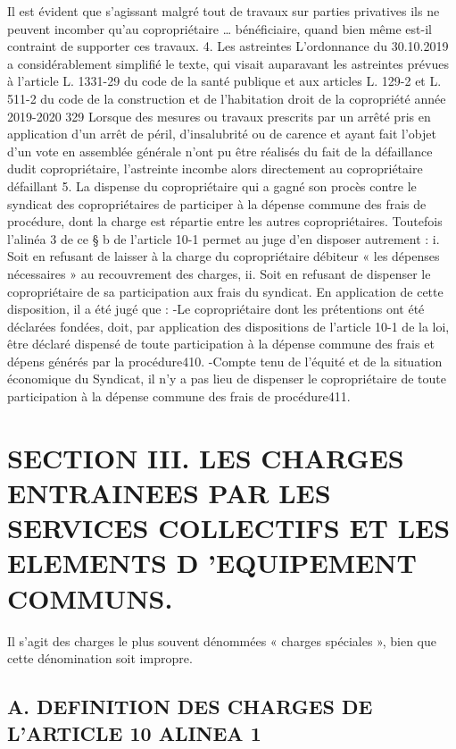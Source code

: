 		Il est évident que s’agissant malgré tout de travaux sur parties privatives ils ne peuvent incomber qu’au copropriétaire … bénéficiaire, quand bien même est-il contraint de supporter ces travaux.
		4. Les astreintes
		L’ordonnance du 30.10.2019 a considérablement simplifié le texte, qui visait auparavant les astreintes prévues à l’article L. 1331-29 du code de la santé publique et aux articles L. 129-2 et L. 511-2 du code de la construction et de l’habitation
		droit de la copropriété année 2019-2020
		329
		Lorsque des mesures ou travaux prescrits par un arrêté pris en application d’un arrêt de péril, d’insalubrité ou de carence et ayant fait l’objet d’un vote en assemblée générale n’ont pu être réalisés du fait de la défaillance dudit copropriétaire, l’astreinte incombe alors directement au copropriétaire défaillant
		5. La dispense du copropriétaire qui a gagné son procès contre le syndicat des copropriétaires de participer à la dépense commune des frais de procédure, dont la charge est répartie entre les autres copropriétaires.
		Toutefois l’alinéa 3 de ce § b de l’article 10-1 permet au juge d’en disposer autrement :
		i. Soit en refusant de laisser à la charge du copropriétaire débiteur « les dépenses nécessaires » au recouvrement des charges,
		ii. Soit en refusant de dispenser le copropriétaire de sa participation aux frais du syndicat.
		En application de cette disposition, il a été jugé que :
		-Le copropriétaire dont les prétentions ont été déclarées fondées, doit, par application des dispositions de l’article 10-1 de la loi, être déclaré dispensé de toute participation à la dépense commune des frais et dépens générés par la procédure410.
		-Compte tenu de l’équité et de la situation économique du Syndicat, il n’y a pas lieu de dispenser le copropriétaire de toute participation à la dépense commune des frais de procédure411.
	
\section{SECTION III. LES CHARGES ENTRAINEES PAR LES SERVICES COLLECTIFS ET LES ELEMENTS D 'EQUIPEMENT COMMUNS.}
	
	Il s’agit des charges le plus souvent dénommées « charges spéciales », bien que cette dénomination soit impropre.
	
	\subsection{A. DEFINITION DES CHARGES DE L’ARTICLE 10 ALINEA 1}
	
